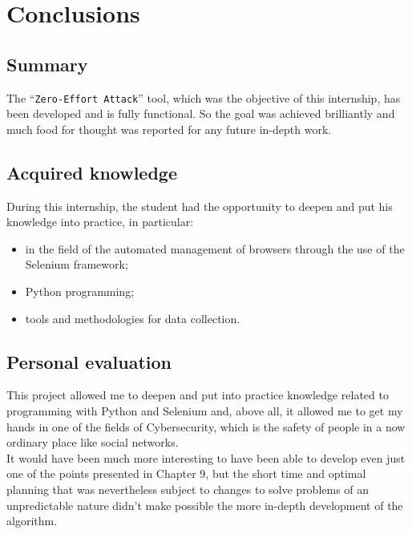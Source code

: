 
\chapter{Conclusions}
\label{cap:conclusions}
\section{Summary}
The ``\texttt{Zero-Effort Attack}'' tool, which was the objective of this internship, has been developed and is fully functional. So the goal was achieved brilliantly and much food for thought was reported for any future in-depth work.
\section{Acquired knowledge}
During this internship, the student had the opportunity to deepen and put his knowledge into practice, in particular:
\begin{itemize}
	\item in the field of the automated management of browsers through the use of the Selenium framework;
	\item Python programming;
	\item tools and methodologies for data collection.
\end{itemize}
\section{Personal evaluation}
This project allowed me to deepen and put into practice knowledge related to programming with Python and Selenium and, above all, it allowed me to get my hands in one of the fields of Cybersecurity, which is the safety of people in a now ordinary place like social networks.\\
It would have been much more interesting to have been able to develop even just one of the points presented in Chapter 9, but the short time and optimal planning that was nevertheless subject to changes to solve problems of an unpredictable nature didn't make possible the more in-depth development of the algorithm.